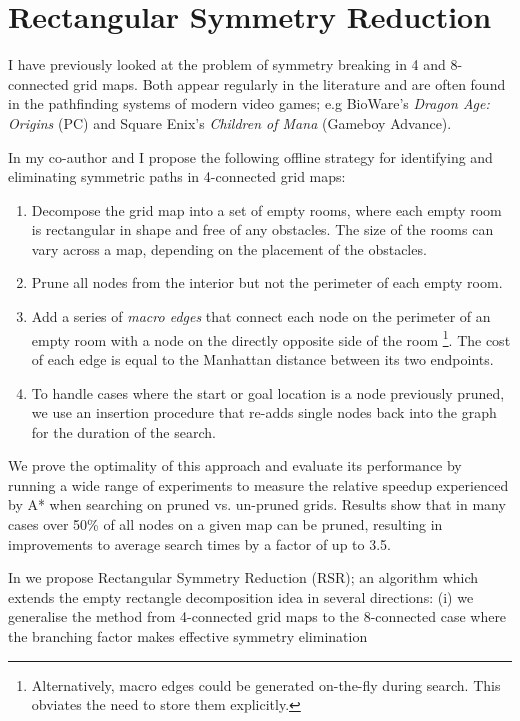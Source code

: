 \section{Rectangular Symmetry Reduction}
\label{sec:currentwork}
I have previously looked at the problem of symmetry breaking in 4 and 8-connected
grid maps.
Both appear regularly in the literature \cite{yap02} and are often found in the 
pathfinding systems of modern video games; e.g BioWare's  \emph{Dragon Age:
Origins} (PC) and Square Enix's \emph{Children of Mana} (Gameboy Advance).
\par 
In \cite{harabor10} my co-author and I propose the following offline strategy 
for identifying and eliminating symmetric paths in 4-connected grid maps:
\begin{enumerate}
\item{Decompose the grid map into a set of empty rooms, where each empty room is 
rectangular in shape and free of any obstacles. 
The size of the rooms can vary across a map, depending
on the placement of the obstacles.}
\item{Prune all nodes from the interior but not the perimeter of each empty
room.}
\item{Add a series of \emph{macro edges} that connect each node on the perimeter of an empty room
with a node on the directly opposite side of the room 
\footnote{Alternatively, macro edges could be generated on-the-fly during search. 
This obviates the need to store them explicitly.}.
The cost of each edge is equal to the Manhattan distance between its two endpoints.
}
\item{To handle cases where the start or goal location is a node previously pruned, we
use an insertion procedure that re-adds single nodes back into the graph for the
duration of the search.}
\end{enumerate}
We prove the optimality of this approach and evaluate its performance by running a
wide range of experiments to measure the relative speedup experienced by A* 
when searching on pruned vs. un-pruned grids.
Results show that in many
cases over 50\% of all nodes on a given map can be pruned, resulting in
improvements to average search times by a factor of up to 3.5.
\par
In \cite{harabor11a} we propose Rectangular Symmetry Reduction (RSR); an 
algorithm which extends the empty rectangle decomposition idea in several directions: 
(i) we generalise the method from 4-connected grid maps to the
8-connected case where the branching factor makes effective symmetry elimination
